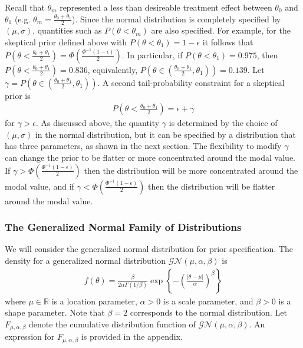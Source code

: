 \documentclass[12pt]{article}
\begin{document}
Recall that $\theta_m$ represented a less than desireable treatment effect between $\theta_0$ and $\theta_1$ (e.g. $\theta_m=\frac{\theta_0+\theta_1}{2}$). Since the normal distribution is completely specified by $(\mu, \sigma)$, quantities such as $P(\theta<\theta_m)$ are also specified. For example, for the skeptical prior defined above with $P(\theta<\theta_1)=1-\epsilon$ it follows that $P(\theta<\frac{\theta_0+\theta_1}{2})=\Phi(\frac{\Phi^{-1}(1-\epsilon)}{2})$. In particular, if $P(\theta<\theta_1)=0.975$, then $P(\theta<\frac{\theta_0+\theta_1}{2})=0.836$, equivalently, $P(\theta\in(\frac{\theta_0+\theta_1}{2},\theta_1))=0.139$. Let $\gamma=P(\theta\in(\frac{\theta_0+\theta_1}{2},\theta_1))$. 
A second tail-probability constraint for a skeptical prior is
\begin{align}\label{eq:skptpriortail}
P(\theta<\frac{\theta_0+\theta_1}{2})=\epsilon+\gamma
\end{align}
for $\gamma>\epsilon$. 
As discussed above, the quantity $\gamma$ is determined by the choice of $(\mu,\sigma)$ in the normal distribution, but it can be specified by a distribution that has three parameters, as shown in the next section. The flexibility to modify $\gamma$ can change the prior to be flatter or more concentrated around the modal value. If $\gamma>\Phi(\frac{\Phi^{-1}(1-\epsilon)}{2})$ then the distribution will be more concentrated around the modal value, and if $\gamma<\Phi(\frac{\Phi^{-1}(1-\epsilon)}{2})$ then the distribution will be flatter around the modal value.

\subsubsection{The Generalized Normal Family of Distributions}
We will consider the generalized normal distribution \citep{Nadarajah2005} for prior specification. The density for a generalized normal distribution $\mathcal{GN}(\mu,\alpha,\beta)$ is
\begin{align}\label{eq:generalizednormalkernel}
f(\theta)=\frac{\beta}{2\alpha\Gamma(1/\beta)}\exp\left\{-\left(\frac{|\theta-\mu|}{\alpha}\right)^\beta\right\}
\end{align} where $\mu\in\mathbb{R}$ is a location parameter, $\alpha>0$ is a scale parameter, and $\beta>0$ is a shape parameter. Note that $\beta=2$ corresponds to the normal distribution. Let $F_{\mu,\alpha,\beta}$ denote the cumulative distribution function of $\mathcal{GN}(\mu,\alpha,\beta)$. An expression for $F_{\mu,\alpha,\beta}$ is provided in the appendix.
\end{document}
